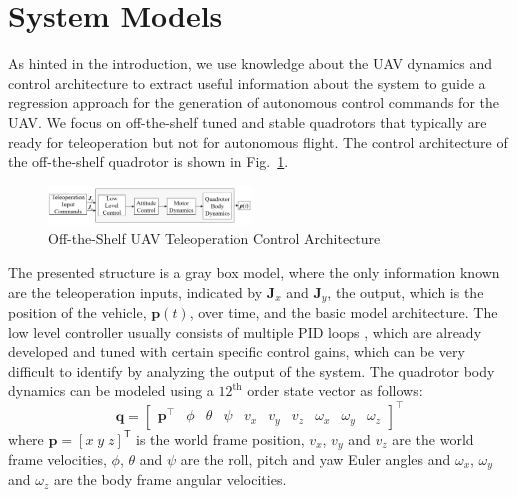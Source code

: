 \documentclass[letterpaper, 10 pt, conference]{ieeeconf}  %
\newcommand\NB[1]{$\spadesuit$\footnote{NB: #1}}
\begin{document}
\section{System Models} \label{sec:sysdyn}
As hinted in the introduction, we use knowledge about the UAV dynamics and control architecture to extract useful information about the system to guide a regression approach for the generation of autonomous control commands for the UAV. We focus on off-the-shelf tuned and stable quadrotors that typically are ready for teleoperation but not for autonomous flight. The control architecture of the off-the-shelf quadrotor is shown in Fig.~\ref{fig:otsctrl}.
\begin{figure}[ht]
    \includegraphics[width=0.48\textwidth]{images/Blocks.PNG}
    \caption{Off-the-Shelf UAV Teleoperation Control Architecture}
    \label{fig:otsctrl}
\end{figure}
The presented structure is a gray box model, where the only information known are the teleoperation inputs, indicated by $\bm{J}_x$ and $\bm{J}_y$, the output, which is the position of the vehicle, $\bm{p}(t)$, over time, and the basic model architecture. The low level controller usually consists of multiple PID loops \cite{esen}, which are already developed and tuned with certain specific control gains, which can be very difficult to identify by analyzing the output of the system. The quadrotor body dynamics can be modeled using a $12^{\text{th}}$ order state vector as follows:
\begin{equation}
    \bm{q} = 
    \begin{bmatrix}
    \bm{p}^\intercal & \phi & \theta & \psi & v_x & v_y & v_z & \omega_x & \omega_y & \omega_z
    \end{bmatrix}^\intercal \nonumber
\end{equation} 
where $\bm{p}=[x \; y \; z]^{\mathsf{T}}$ is the world frame position, $v_{x}$, $v_{y}$ and $v_z$ are the world frame velocities, $\phi$, $\theta$ and $\psi$ are the roll, pitch and yaw Euler angles and $\omega_{x}$, $\omega_{y}$ and $\omega_{z}$ are the body frame angular velocities.
\end{document}
